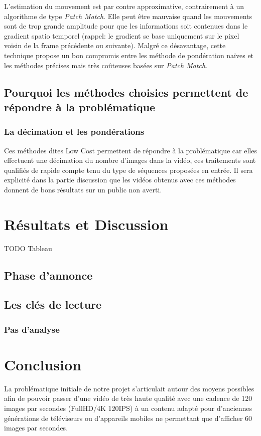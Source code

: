 \documentclass[fleqn,10pt]{SelfArx} %
\begin{document}
L'estimation du mouvement est par contre approximative, contrairement à un algorithme de type {\em Patch Match}.
Elle peut être mauvaise quand les mouvements sont de trop grande amplitude pour que les informations soit contenues dans 
le gradient spatio temporel (rappel: le gradient se base uniquement sur le pixel voisin de la frame précédente
ou suivante). Malgré ce désavantage, cette technique propose un bon compromis entre les méthode de
pondération naïves et les méthodes précises mais très coûteuses basées sur {\em Patch Match}.

\subsection{Pourquoi les méthodes choisies permettent de répondre à la problématique}

\subsubsection{La décimation et les pondérations}
Ces méthodes dites \og Low Cost \fg{} permettent de répondre à la problématique car elles effectuent une décimation du nombre d'images dans la vidéo, ces traitements sont qualifiés de rapide compte tenu du type de séquences proposées en entrée. Il sera explicité dans la partie discussion que les vidéos obtenus avec ces méthodes donnent de bons résultats sur un public non averti.

\section{Résultats et Discussion}
TODO Tableau
\subsection{Phase d'annonce}

\subsection{Les clés de lecture}

\subsubsection{Pas d'analyse}


\section{Conclusion}
La problématique initiale de notre projet s'articulait autour des moyens possibles afin de pouvoir passer d'une vidéo de très haute qualité avec une cadence de 120 images par secondes (FullHD/4K 120IPS) à un contenu adapté pour d'anciennes générations de téléviseurs ou d'appareils mobiles ne permettant que d'afficher 60 images par secondes.
\end{document}
